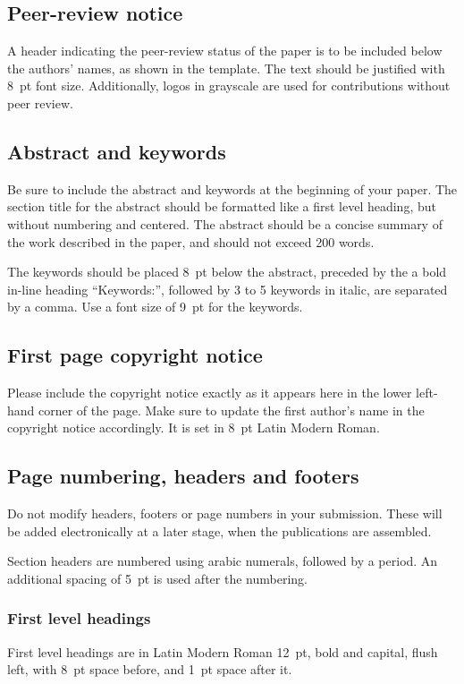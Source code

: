 \documentclass[non-peer-review]{fa2026}
\begin{document}
\subsection{Peer-review notice}
A header indicating the peer-review status of the paper is to be included below the authors' names, as shown in the template. The text should be justified with \SI{8}{pt} font size. Additionally, logos in grayscale are used for contributions without peer review.

\subsection{Abstract and keywords}
Be sure to include the abstract and keywords at the beginning of your paper. The section title for the abstract should be formatted like a first level heading, but without numbering and centered. The abstract should be a concise summary of the work described in the paper, and should not exceed 200 words.

The keywords should be placed \SI{8}{pt} below the abstract, preceded by the a bold in-line heading \enquote{Keywords:}, followed by 3 to 5 keywords in italic, are separated by a comma. Use a font size of \SI{9}{pt} for the keywords.

\subsection{First page copyright notice}
Please include the copyright notice exactly as it appears here in the lower left-hand corner of the page. Make sure to update the first author’s name in the copyright notice accordingly. It is set in \SI{8}{pt} Latin Modern Roman. 

\subsection{Page numbering, headers and footers}
Do not modify headers, footers or page numbers in your submission. These will be added electronically at a later stage, when the publications are assembled.

Section headers are numbered using arabic numerals, followed by a period. An additional spacing of \SI{5}{pt} is used after the numbering.

\subsubsection{First level headings}
First level headings are in Latin Modern Roman \SI{12}{pt}, bold and capital, flush left, with \SI{8}{pt} space before, and \SI{1}{pt} space after it.
\end{document}
